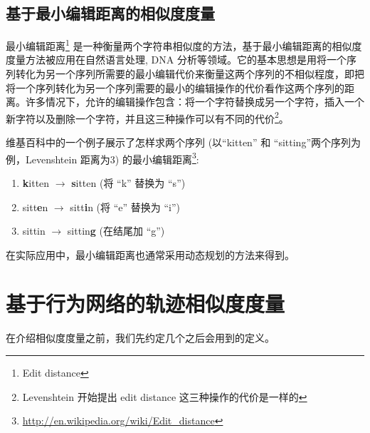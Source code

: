 \subsection{基于最小编辑距离的相似度度量}
最小编辑距离\footnote{Edit distance} 是一种衡量两个字符串相似度的方法，基于最小编辑距离的相似度度量方法被应用在自然语言处理, DNA 分析等领域。它的基本思想是用将一个序列转化为另一个序列所需要的最小编辑代价来衡量这两个序列的不相似程度，即把将一个序列转化为另一个序列需要的最小的编辑操作的代价看作这两个序列的距离。许多情况下，允许的编辑操作包含：将一个字符替换成另一个字符，插入一个新字符以及删除一个字符，并且这三种操作可以有不同的代价\footnote{Levenshtein 开始提出 edit distance 这三种操作的代价是一样的}。\par
维基百科中的一个例子展示了怎样求两个序列 (以``kitten'' 和 ``sitting''两个序列为例，Levenshtein 距离为3) 的最小编辑距离\footnote{\url{http://en.wikipedia.org/wiki/Edit_distance}}:
\begin{enumerate}
\vspace{1mm}
\item \textbf{k}itten $\to$ \textbf{s}itten (将 ``k'' 替换为 ``s'')
\item sitt\textbf{e}n $\to$ sitt\textbf{i}n (将 ``e'' 替换为 ``i'')
\item sittin $\to$ sittin\textbf{g} (在结尾加 ``g'')
\vspace{1mm}

\end{enumerate}
在实际应用中，最小编辑距离也通常采用动态规划的方法来得到。


\section{基于行为网络的轨迹相似度度量}
在介绍相似度度量之前，我们先约定几个之后会用到的定义。
\label{simlarity:similarity}
